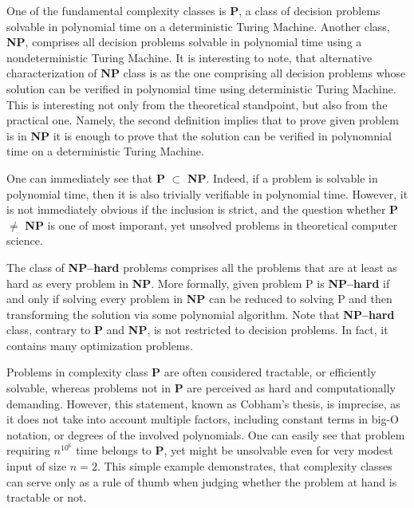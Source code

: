 One of the fundamental complexity classes is \textbf{P}, a class of decision problems solvable in polynomial time on a deterministic Turing Machine. Another class, \textbf{NP}, comprises all decision problems solvable in polynomial time using a nondeterministic Turing Machine. It is interesting to note, that alternative characterization of \textbf{NP} class is as the one comprising all decision problems whose solution can be verified in polynomial time using deterministic Turing Machine. This is interesting not only from the theoretical standpoint, but also from the practical one. Namely, the second definition implies that to prove given problem is in \textbf{NP} it is enough to prove that the solution can be verified in polynomnial time on a deterministic Turing Machine.

One can immediately see that \textbf{P} $\subset$ \textbf{NP}. Indeed, if a problem is solvable in polynomial time, then it is also trivially verifiable in polynomial time. However, it is not immediately obvious if the inclusion is strict, and the question whether \textbf{P} $\ne$ \textbf{NP} is one of most imporant, yet unsolved problems in theoretical computer science.

The class of \textbf{NP--hard} problems comprises all the problems that are at least as hard as every problem in \textbf{NP}. More formally, given problem P is \textbf{NP--hard} if and only if solving every problem in \textbf{NP} can be reduced to solving P and then transforming the solution via some polynomial algorithm. Note that \textbf{NP--hard} class, contrary to \textbf{P} and \textbf{NP},  is not restricted to decision problems. In fact, it contains many optimization problems.

Problems in complexity class \textbf{P} are often considered tractable, or efficiently solvable, whereas problems not in \textbf{P} are perceived as hard and computationally demanding. However, this statement, known as Cobham's thesis, is imprecise, as it does not take into account multiple factors, including constant terms in big-O notation, or degrees of the involved polynomials. One can easily see that problem requiring $n^{10^6}$ time belongs to \textbf{P}, yet might be unsolvable even for very modest input of size $n=2$. This simple example demonstrates, that complexity classes can serve only as a rule of thumb when judging whether the problem at hand is tractable or not.

